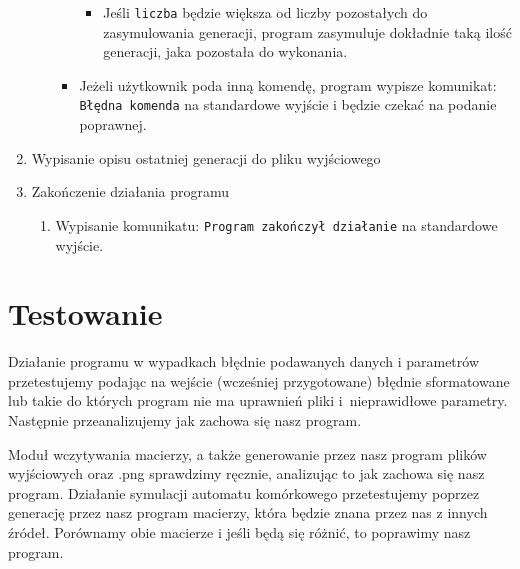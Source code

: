 \documentclass[a4paper,11pt, notitlepage ]{article}
\begin{document}
\begin{enumerate}
\begin{enumerate}[label*=\arabic*.]
\begin{itemize}
\begin{itemize}
\item Jeśli \verb+liczba+ będzie większa od liczby pozostałych do zasymulowania generacji, program zasymuluje dokładnie taką ilość generacji, jaka pozostała do wykonania.
\end{itemize}
\item Jeżeli użytkownik poda inną komendę, program wypisze komunikat: \verb+Błędna komenda+ na standardowe wyjście i będzie czekać na podanie poprawnej.
\end{itemize}
\end{enumerate}
\item Wypisanie opisu ostatniej generacji do pliku wyjściowego
\item Zakończenie działania programu
\begin{enumerate}[label*=\arabic*.]
\item Wypisanie komunikatu: \verb+Program zakończył działanie+ na standardowe wyjście.
\end{enumerate}
\end{enumerate}
\section{Testowanie}
Działanie programu w wypadkach błędnie podawanych danych i parametrów przetestujemy podając na wejście (wcześniej przygotowane) błędnie sformatowane lub takie do których program nie ma uprawnień pliki i~nieprawidłowe parametry. Następnie przeanalizujemy jak zachowa się nasz program.

Moduł wczytywania macierzy, a także generowanie przez nasz program plików wyjściowych oraz .png sprawdzimy ręcznie, analizując to jak zachowa się nasz program. Działanie symulacji automatu komórkowego przetestujemy poprzez generację przez nasz program macierzy, która będzie znana przez nas z innych źródeł. Porównamy obie macierze i jeśli będą się różnić, to poprawimy nasz program.
\end{document}
